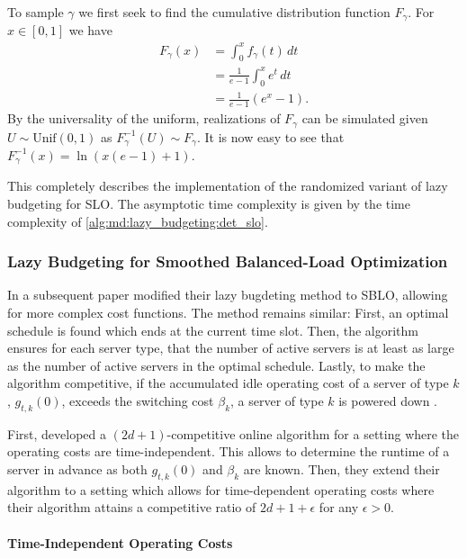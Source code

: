 To sample $\gamma$ we first seek to find the cumulative distribution function $F_{\gamma}$. For $x \in [0,1]$ we have \begin{align*}
    F_{\gamma}(x) &= \int_0^x f_{\gamma}(t) \,dt \\
                  &= \frac{1}{e-1} \int_0^x e^t \,dt \\
                  &= \frac{1}{e-1} (e^x - 1).
\end{align*} By the universality of the uniform, realizations of $F_{\gamma}$ can be simulated given $U \sim \text{Unif}(0,1)$ as $F_{\gamma}^{-1}(U) \sim F_{\gamma}$. It is now easy to see that $F_{\gamma}^{-1}(x) = \ln (x (e - 1) + 1)$.

This completely describes the implementation of the randomized variant of lazy budgeting for SLO. The asymptotic time complexity is given by the time complexity of \autoref{alg:md:lazy_budgeting:det_slo}.

\subsubsection{Lazy Budgeting for Smoothed Balanced-Load Optimization}

In a subsequent paper \citeauthor*{Albers2021_2} modified their lazy bugdeting method to SBLO, allowing for more complex cost functions. The method remains similar: First, an optimal schedule is found which ends at the current time slot. Then, the algorithm ensures for each server type, that the number of active servers is at least as large as the number of active servers in the optimal schedule. Lastly, to make the algorithm competitive, if the accumulated idle operating cost of a server of type $k$, $g_{t,k}(0)$, exceeds the switching cost $\beta_k$, a server of type $k$ is powered down \cite{Albers2021_2}.

First, \citeauthor*{Albers2021_2} developed a $(2d+1)$-competitive online algorithm for a setting where the operating costs are time-independent. This allows to determine the runtime of a server in advance as both $g_{t,k}(0)$ and $\beta_k$ are known. Then, they extend their algorithm to a setting which allows for time-dependent operating costs where their algorithm attains a competitive ratio of $2d+1+\epsilon$ for any $\epsilon > 0$.

\paragraph{Time-Independent Operating Costs}

